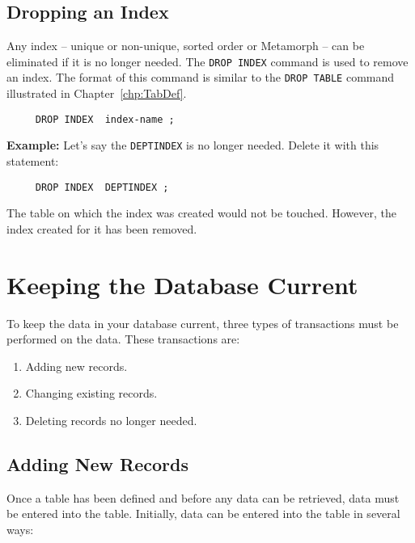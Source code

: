 \section{Dropping an Index}

Any index -- unique or non-unique, sorted order or Metamorph -- can be
eliminated if it is no longer needed.  The {\tt DROP INDEX} command is
used to remove an index.  The format of this command is similar to the
{\tt DROP TABLE} command illustrated in Chapter~\ref{chp:TabDef}.

\begin{verbatim}
     DROP INDEX  index-name ;
\end{verbatim}

{\bf Example:}
Let's say the \verb`DEPTINDEX` is no longer needed.  Delete it with this
statement:
\begin{verbatim}
     DROP INDEX  DEPTINDEX ;
\end{verbatim}

%

The table on which the index was created would not be touched.
However, the index created for it has been removed.

\chapter{Keeping the Database Current}{\label{chp:DBCurr}}

To keep the data in your database current, three types of transactions
must be performed on the data.  These transactions are:

\begin{enumerate}
\item Adding new records.
\item Changing existing records.
\item Deleting records no longer needed.
\end{enumerate}

\section{Adding New Records}

Once a table has been defined and before any data can be retrieved,
data must be entered into the table.  Initially, data can be entered
into the table in several ways:

